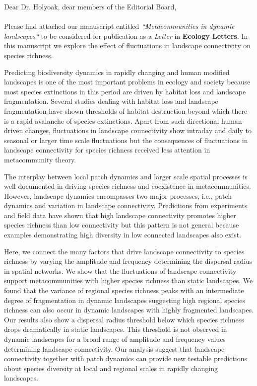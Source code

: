 \documentclass{article}
\begin{document}
\parskip 6pt
\baselineskip 12pt
\noindent Dear Dr. Holyoak, dear members of the Editorial Board,\\
\\

Please find attached our manuscript entitled \emph{``Metacommunities in dynamic landscapes``} to be considered for publication as a \emph{Letter} in \textbf{Ecology Letters}. In this manuscript we explore the effect of fluctuations in landscape connectivity on species richness. 

Predicting biodiversity dynamics in rapidly changing and human modified landscapes is one of the most important problems in ecology and society because most species extinctions in this period are driven by habitat loss and landscape fragmentation. Several studies dealing with habitat loss and landscape fragmentation have shown thresholds of habitat destruction beyond which there is a rapid avalanche of species extinctions. Apart from such directional human-driven changes, fluctuations in landscape connectivity show intraday and daily to seasonal or larger time scale fluctuations but the consequences of fluctuations in landscape connectivity for species richness received less attention in metacommunity theory.

The interplay between local patch dynamics and larger scale spatial processes is well documented in driving species richness and coexistence in metacommunities. However, landscape dynamics encompasses two major processes, i.e., patch dynamics and variation in landscape connectivity. Predictions from experiments and field data have shown that high landscape connectivity promotes higher species richness than low connectivity but this pattern is not general because examples demonstrating high diversity in low connected landscapes also exist. 

Here, we connect the many factors that drive landscape connectivity to species richness by varying the amplitude and frequency determining the dispersal radius in spatial networks. We show that the fluctuations of landscape connectivity support metacommunities with higher species richness than static landscapes. We found that the variance of regional species richness peaks with an intermediate degree of fragmentation in dynamic landscapes suggesting high regional species richness can also occur in dynamic landscapes with highly fragmented landscapes. Our results also show a dispersal radius threshold below which species richness drops dramatically in static landscapes. This threshold is not observed in dynamic landscapes for a broad range of amplitude and frequency values determining landscape connectivity. Our analysis suggest that landscape connectivity together with patch dynamics can provide new testable predictions about species diversity at local and regional scales in rapidly changing landscapes.
\end{document}
